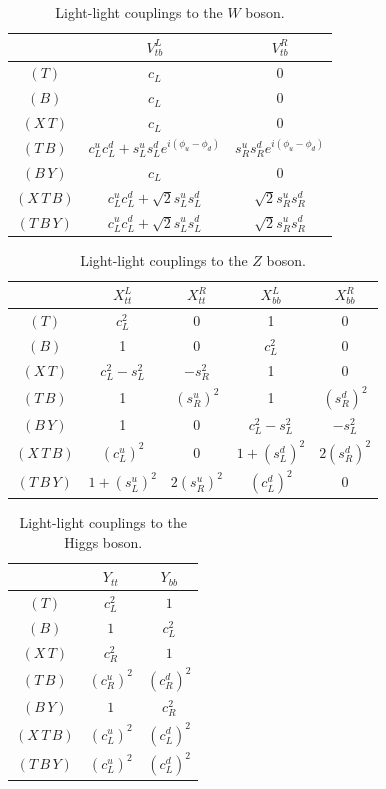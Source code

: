 \documentclass[12pt,a4paper]{article}
\newcommand{\ts}{$(T)$}
\newcommand{\bs}{$(B)$}
\newcommand{\xt}{$(X\,T)$}
\newcommand{\tb}{$(T\,B)$}
\newcommand{\by}{$(B\,Y)$}
\newcommand{\xtb}{$(X\,T\,B)$}
\newcommand{\tby}{$(T\,B\,Y)$}
\newcommand{\slx}{s_L}
\newcommand{\slu}{s_L^u}
\newcommand{\sld}{s_L^d}
\newcommand{\clx}{c_L}
\newcommand{\clu}{c_L^u}
\newcommand{\cld}{c_L^d}
\newcommand{\srx}{s_R}
\newcommand{\sru}{s_R^u}
\newcommand{\srd}{s_R^d}
\newcommand{\crx}{c_R}
\newcommand{\cru}{c_R^u}
\newcommand{\crd}{c_R^d}
\newcommand{\sqt}{\sqrt{2}}
\begin{document}
\begin{table}[htb]
\begin{center}
\begin{tabular}{c|cc}
& $V_{tb}^L$ & $V_{tb}^R$ 
\\ \hline
\ts & $\clx$ & 0
\\
\bs & $\clx$ & 0
\\
\xt & $\clx$ & 0
\\
\tb & $\clu \cld + \slu \sld e^{i(\phi_u-\phi_d)}$ & $\sru \srd e^{i(\phi_u-\phi_d)}$
\\
\by & $\clx$ & 0
\\
\xtb & $\clu \cld + \sqt \slu \sld$ & $\sqt \sru \srd$
\\
\tby & $\clu \cld + \sqt \slu \sld$ & $\sqt \sru \srd$
%
\end{tabular}
\caption{Light-light couplings to the $W$ boson.}
\label{tab:llW}
\end{center}
\end{table}



\begin{table}[htb]
\begin{center}
\begin{tabular}{c|cccc}
& $X_{tt}^L$ & $X_{tt}^R$ & $X_{bb}^L$ & $X_{bb}^R$ 
\\ \hline
\ts & $\clx^2$ & 0 & 1 & 0
\\
\bs & 1 & 0 & $\clx^2$ & 0
\\
\xt & $\clx^2-\slx^2$ & $-\srx^2$ & 1 & 0
\\
\tb & 1 & $(\sru)^2$ & 1 & $(\srd)^2$
\\
\by & 1 & 0 & $\clx^2-\slx^2$ & $-\slx^2$
\\
\xtb & $(\clu)^2$ & 0 & $1+(\sld)^2$ & $2(\srd)^2$
\\
\tby & $1+(\slu)^2$ & $2(\sru)^2$ & $(\cld)^2$ & 0
%
\end{tabular}
\caption{Light-light couplings to the $Z$ boson.}
\label{tab:llZ}
\end{center}
\end{table}



\begin{table}[htb]
\begin{center}
\begin{tabular}{c|cc}
& $Y_{tt}$ & $Y_{bb}$  
\\ \hline
\ts & $\clx^2$ & $1$
\\
\bs & $1$ & $\clx^2$
\\
\xt & $\crx^2$ & $1$
\\
\tb & $(\cru)^2$ & $(\crd)^2$
\\
\by & $1$ & $\crx^2$ 
\\
\xtb & $(\clu)^2$ & $(\cld)^2$
\\
\tby & $(\clu)^2$ & $(\cld)^2$
%
\end{tabular}
\caption{Light-light couplings to the Higgs boson.}
\label{tab:llH}
\end{center}
\end{table}
\end{document}
